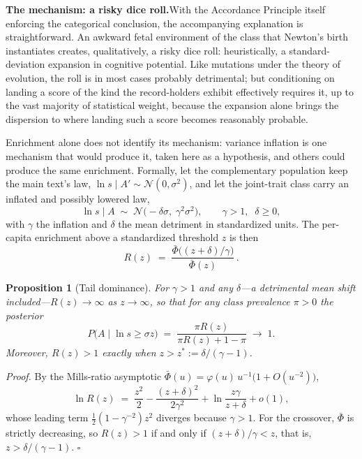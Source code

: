 \documentclass{article}
\newtheorem{proposition}{Proposition}
\begin{document}
\par\medskip\noindent\textbf{The mechanism: a risky dice roll.}\enspace With the Accordance Principle itself enforcing the categorical conclusion, the accompanying explanation is straightforward. An awkward fetal environment of the class that Newton's birth instantiates creates, qualitatively, a risky dice roll: heuristically, a standard-deviation expansion in cognitive potential. Like mutations under the theory of evolution, the roll is in most cases probably detrimental; but conditioning on landing a score of the kind the record-holders exhibit effectively requires it, up to the vast majority of statistical weight, because the expansion alone brings the dispersion to where landing such a score becomes reasonably probable.

Enrichment alone does not identify its mechanism: variance inflation is one mechanism that would produce it, taken here as a hypothesis, and others could produce the same enrichment. Formally, let the complementary population keep the main text's law, $\ln s \mid A' \sim \mathcal{N}(0, \sigma^{2})$, and let the joint-trait class carry an inflated and possibly lowered law,
\begin{equation}\label{eq:app-mix}
  \ln s \mid A \;\sim\; \mathcal{N}\bigl(-\delta\sigma,\; \gamma^{2}\sigma^{2}\bigr), \qquad \gamma > 1,\;\; \delta \geq 0,
\end{equation}
with $\gamma$ the inflation and $\delta$ the mean detriment in standardized units. The per-capita enrichment above a standardized threshold $z$ is then
\begin{equation}\label{eq:app-R}
  R(z) \;=\; \frac{\bar\Phi\bigl((z+\delta)/\gamma\bigr)}{\bar\Phi(z)}\,.
\end{equation}

\begin{proposition}[Tail dominance]\label{app:prop-tail}
For $\gamma > 1$ and any $\delta$---a detrimental mean shift included---$R(z) \to \infty$ as $z \to \infty$, so that for any class prevalence $\pi > 0$ the posterior
\[
  P\bigl(A \mid \ln s \geq \sigma z\bigr) \;=\; \frac{\pi R(z)}{\pi R(z) + 1 - \pi} \;\longrightarrow\; 1.
\]
Moreover, $R(z) > 1$ exactly when $z > z^{\ast} := \delta/(\gamma - 1)$.
\end{proposition}

\noindent\textit{Proof.} By the Mills-ratio asymptotic $\bar\Phi(u) = \varphi(u)\,u^{-1}\bigl(1 + O(u^{-2})\bigr)$,
\[
  \ln R(z) \;=\; \frac{z^{2}}{2} - \frac{(z+\delta)^{2}}{2\gamma^{2}} + \ln\frac{z\gamma}{z+\delta} + o(1),
\]
whose leading term $\tfrac12(1-\gamma^{-2})z^{2}$ diverges because $\gamma > 1$. For the crossover, $\bar\Phi$ is strictly decreasing, so $R(z) > 1$ if and only if $(z+\delta)/\gamma < z$, that is, $z > \delta/(\gamma-1)$. $\square$
\end{document}
